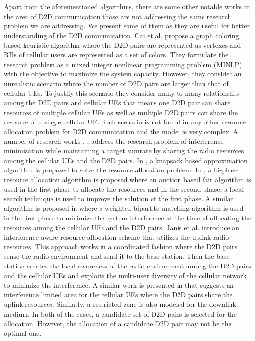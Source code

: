 \documentclass[times]{dacauth}
\begin{document}
\noindent
Apart from the aforementioned algorithms, there are some other notable works in the area of D2D communication those are not addressing the same research problem we are addressing. We present some of them as they are useful for better understanding of the D2D communication. Cai et al.\cite{cai} propose a graph coloring based heuristic algorithm where the D2D pairs are represented as vertexes and RBs of cellular users are represented as a set of colors. They formulate the research problem as a mixed integer nonlinear programming problem (MINLP) with the objective to maximize the system capacity. However, they consider an unrealistic scenario where the number of D2D pairs are larger than that of cellular UEs. To justify this scenario they consider many to many relationship among the D2D pairs and cellular UEs that means one D2D pair can share resources of multiple cellular UEs as well as multiple D2D pairs can share the resource of a single cellular UE. Such scenario is not found in any other resource allocation problem for D2D communication and the model is very complex. A number of research works \cite{icc}, \cite{islam2016radio}, \cite{islam2015reducing} address the research problem of interference minimization while maintaining a target sumrate by sharing the radio resources among the cellular UEs and the D2D pairs. In \cite{islam2015reducing}, a knapsack based approximation algorithm is proposed to solve the resource allocation problem. In \cite{islam2016radio}, a bi-phase resource allocation algorithm is proposed where an auction based fair algorithm is used in the first phase to allocate the resources and in the second phase, a local search technique is used to improve the solution of the first phase. A similar algorithm is proposed in \cite{icc} where a weighted bipartite matching algorithm is used in the first phase to minimize the system interference at the time of allocating the resources among the cellular UEs and the D2D pairs. Janis et al. \cite{janis} introduce an interference aware resource allocation scheme that utilizes the uplink radio resources. This approach works in a coordinated fashion where the D2D pairs sense the radio environment and send it to the base station. Then the base station creates the local awareness of the radio environment among the D2D pairs and the cellular UEs and exploits the multi-user diversity of the cellular network to minimize the interference. A similar work is presented in \cite{min2011capacity} that suggests an interference limited area for the cellular UEs where the D2D pairs share the uplink resources. Similarly, a restricted zone is also modeled for the downlink medium. In both of the cases, a candidate set of D2D pairs is selected for the allocation. However, the allocation of a candidate D2D pair may not be the optimal one. 
\end{document}
